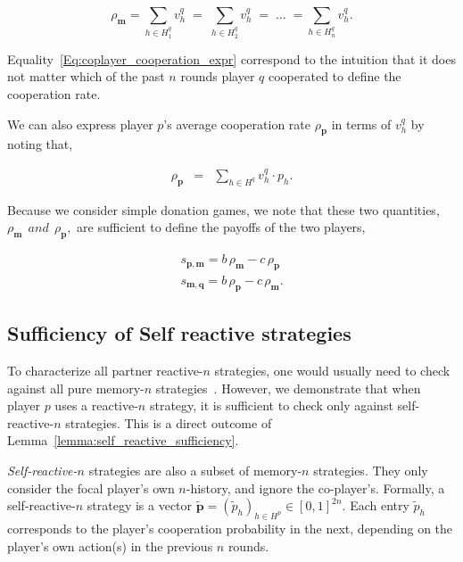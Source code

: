 \documentclass{article}
\theoremstyle{definition}
\begin{document}
\begin{equation}\label{Eq:coplayer_cooperation_expr}
  \rho_\mathbf{m} = \sum_{h \in H^{q}_{1}} v^q_{h} \; = \; \sum_{h \in H^{q}_{2}} v^q_{h} \; = \; \dots \; = \sum_{h \in H^{q}_{n}} v^q_{h}.
\end{equation}

Equality~\eqref{Eq:coplayer_cooperation_expr} correspond to the intuition that
it does not matter which of the past $n$ rounds player $q$ cooperated to define
the cooperation rate.

We can also express player $p$'s average cooperation rate $\rho_\mathbf{p}$ in terms
of $v^q_{h}$ by noting that,

\begin{equation} \label{Eq:rhop_alln}
  \begin{array}{lll}
    \rho_\mathbf{p} &= &\displaystyle \sum_{h \in H^q} v^q_{h} \cdot p_{h}.
  \end{array}
\end{equation}

Because we consider simple donation games, we note that these two quantities,
$\rho_\mathbf{m}  ~~and~~ \rho_\mathbf{p},$ are
sufficient to define the payoffs of the two players,

\begin{equation} \label{Eq:payoff}
  \begin{array}{lll}
  s_{\mathbf{p}, \mathbf{m}}  =  b\, \rho_\mathbf{m} - c\, \rho_\mathbf{p}\\
  s_{\mathbf{m}, \mathbf{q}} = b\, \rho_\mathbf{p} - c\, \rho_\mathbf{m}.
  \end{array}
\end{equation}


\subsection{Sufficiency of Self reactive strategies}\label{section:self_reactive_sufficiency}

To characterize all partner reactive-$n$ strategies, one would usually need
to check against all pure memory-$n$ strategies~\cite{mcavoy:PRSA:2019}.
However, we demonstrate that when player $p$ uses a reactive-$n$
strategy, it is sufficient to check only against self-reactive-$n$
strategies. This is a direct outcome of Lemma~\ref{lemma:self_reactive_sufficiency}.

{\it Self-reactive-$n$} strategies are also a subset of memory-$n$ strategies.
They only consider the focal player's own $n$-history, and ignore the co-player's.
Formally, a self-reactive-$n$ strategy is a vector
$\mathbf{\tilde{p}} = (\tilde{p}_h)_{h \in H^p} \in [0, 1] ^ {2n}$. Each entry
$\tilde{p}_h$ corresponds to the player's cooperation probability in the next,
depending on the player's own action(s) in the previous $n$ rounds.
\end{document}
